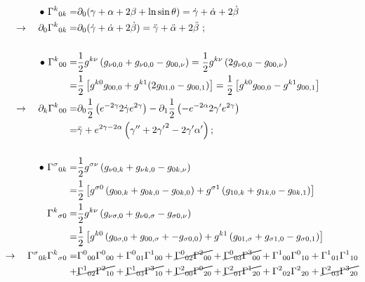 \begin{align*}
  \bullet \text{ } \Gamma^k {}_{0k} =& \partial_0 (\gamma + \alpha + 2\beta + \ln{\sin{\theta}}) = \Dot{\gamma} + \Dot{\alpha} +2\Dot{\beta} 
    \\ \rightarrow \quad \partial_0 \Gamma^k {}_{0k} =& \partial_0  (\Dot{\gamma} + \Dot{\alpha} +2\Dot{\beta})  = \Ddot{\gamma} + \Ddot{\alpha} +2\Ddot{\beta} \text{ ;}
    \\[15pt]  \bullet  \text{ } \Gamma^k {}_{0 0} =& \frac{1}{2} g^{k \nu} \left( g_{\nu 0 ,0} +  g_{\nu 0 ,0} -  g_{0 0,\nu} \right)= \frac{1}{2} g^{k\nu} \left(2g_{\nu 0,0}-g_{00,\nu}\right) 
  \\ =& \frac{1}{2}\left[ g^{k0}g_{0 0,0} + g^{k1}(2g_{0 1,0} - g_{0 0,1})\right] = \frac{1}{2}\left[ g^{k0}g_{0 0,0} - g^{k1} g_{0 0,1}\right] 
   \\ \rightarrow \quad \partial_k \Gamma^k {}_{00} =& \partial_0 \frac{1}{2}\left( e^{-2\gamma}2\dot{\gamma}e^{2\gamma}\right) - \partial_1 \frac{1}{2}\left(-e^{-2\alpha} 2\gamma^\prime e^{2\gamma}\right)
   \\ =& \Ddot{\gamma} + e^{2\gamma-2\alpha}\left(\gamma^{\prime \prime}+2{\gamma^\prime}^2 -2 \gamma^\prime \alpha^\prime \right) \text{;}
    \\[15pt]  \bullet \text{ } \Gamma^\sigma {}_{0 k} =& \frac{1}{2} g^{\sigma \nu} \left( g_{\nu 0, k} + g_{\nu k, 0} - g_{0 k, \nu}\right) 
    \\=& \frac{1}{2} \left[g^{\sigma 0} \left(  g_{0 0, k} + g_{0 k, 0} - g_{0 k, 0}\right) + g^{\sigma 1} \left( g_{1 0, k} + g_{1 k, 0} - g_{0 k, 1}\right) \right]
    \\ \Gamma^k {}_{\sigma 0} =& \frac{1}{2} g^{k \nu} \left( g_{\nu \sigma, 0} + g_{\nu 0,\sigma} - g_{\sigma 0, \nu}\right) 
    \\=& \frac{1}{2} \left[g^{k 0} \left( g_{0 \sigma, 0} + g_{0 0, \sigma} + - g_{\sigma 0, 0}\right) + g^{k 1}\left( g_{0 1, \sigma} + g_{\sigma 1, 0} - g_{\sigma 0, 1}\right) \right]
    \\ \rightarrow \quad \Gamma^\sigma {}_{0 k} \Gamma^k {}_{\sigma 0}  =& \Gamma^0 {}_{0 0} \Gamma^0 {}_{0 0} + \Gamma^0 {}_{0 1} \Gamma^1 {}_{0 0} + \cancel{\Gamma^0 {}_{0 2} \Gamma^2 {}_{0 0}} + \cancel{\Gamma^0 {}_{0 3} \Gamma^3 {}_{0 0}} + \Gamma^1 {}_{0 0} \Gamma^0 {}_{1 0} + \Gamma^1 {}_{0 1} \Gamma^1 {}_{1 0} 
    \\ +&\cancel{\Gamma^1 {}_{0 2} \Gamma^2 {}_{1 0}} + \cancel{\Gamma^1 {}_{0 3} \Gamma^3 {}_{1 0}} + \cancel{\Gamma^2 {}_{0 0} \Gamma^0 {}_{2 0}} + \cancel{\Gamma^2 {}_{0 1} \Gamma^1 {}_{2 0}} + \Gamma^2 {}_{0 2} \Gamma^2 {}_{2 0} + \cancel{\Gamma^2 {}_{0 3} \Gamma^3 {}_{2 0}} 

\end{align*}
